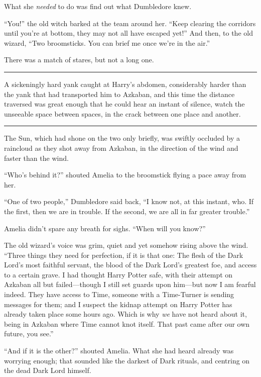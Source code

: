 What she \emph{needed} to do was find out what Dumbledore knew.

``You!'' the old witch barked at the team around her. ``Keep clearing
the corridors until you're at bottom, they may not all have escaped
yet!'' And then, to the old wizard, ``Two broomsticks. You can brief me
once we're in the air.''

There was a match of stares, but not a long one.

\begin{center}\rule{3in}{0.4pt}\end{center}

A sickeningly hard yank caught at Harry's abdomen, considerably harder
than the yank that had transported him to Azkaban, and this time the
distance traversed was great enough that he could hear an instant of
silence, watch the unseeable space between spaces, in the crack between
one place and another.

\begin{center}\rule{3in}{0.4pt}\end{center}

The Sun, which had shone on the two only briefly, was swiftly occluded
by a raincloud as they shot away from Azkaban, in the direction of the
wind and faster than the wind.

``Who's behind it?'' shouted Amelia to the broomstick flying a pace away
from her.

``One of two people,'' Dumbledore said back, ``I know not, at this
instant, who. If the first, then we are in trouble. If the second, we
are all in far greater trouble.''

Amelia didn't spare any breath for sighs. ``When will you know?''

The old wizard's voice was grim, quiet and yet somehow rising above the
wind. ``Three things they need for perfection, if it is that one: The
flesh of the Dark Lord's most faithful servant, the blood of the Dark
Lord's greatest foe, and access to a certain grave. I had thought Harry
Potter safe, with their attempt on Azkaban all but failed---though I
still set guards upon him---but now I am fearful indeed. They have
access to Time, someone with a Time-Turner is sending messages for them;
and I suspect the kidnap attempt on Harry Potter has already taken place
some hours ago. Which is why \emph{we} have not heard about it, being in
Azkaban where Time cannot knot itself. That past came after our own
future, you see.''

``And if it is the other?'' shouted Amelia. What she had heard already
was worrying enough; that sounded like the darkest of Dark rituals, and
centring on the dead Dark Lord himself.


